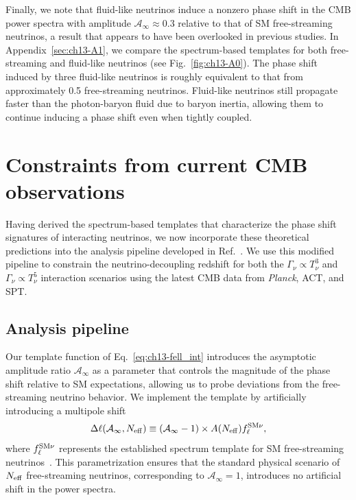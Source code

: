 Finally, we note that fluid-like neutrinos induce a nonzero phase shift in the CMB power spectra with amplitude $\mathcal{A}_\infty \approx 0.3$ relative to that of SM free-streaming neutrinos, a result that appears to have been overlooked in previous studies.
In Appendix~\ref{sec:ch13-A1}, we compare the spectrum-based templates for both free-streaming and fluid-like neutrinos (see Fig.~\ref{fig:ch13-A0}). The phase shift induced by three fluid-like neutrinos is roughly equivalent to that from approximately 0.5 free-streaming neutrinos. Fluid-like neutrinos still propagate faster than the photon-baryon fluid due to baryon inertia, allowing them to continue inducing a phase shift even when tightly coupled.

\section{Constraints from current CMB observations}
\label{sec:ch13-3}

\noindent Having derived the spectrum-based templates that characterize the phase shift signatures of interacting neutrinos, we now incorporate these theoretical predictions into the analysis pipeline developed in Ref.~\cite{Montefalcone:2025unv}. We use this modified pipeline to constrain the neutrino-decoupling redshift for both the $\Gamma_\nu \propto T_\nu^3$ and $\Gamma_\nu \propto T_\nu^5$ interaction scenarios using the latest CMB data from \textit{Planck}, ACT, and SPT.

\subsection{Analysis pipeline}

\noindent Our template function of Eq.~\eqref{eq:ch13-fell_int} introduces the asymptotic amplitude ratio $\mathcal{A}_\infty$ as a parameter that controls the magnitude of the phase shift relative to SM expectations, allowing us to probe deviations from the free-streaming neutrino behavior.
We implement the template by artificially introducing a multipole shift
\begin{align}
    \Delta\ell (\mathcal{A}_\infty,N_\mathrm{eff})\equiv \left(\mathcal{A}_\infty -1\right) \times A(N_\mathrm{eff})f^{\rm SM\nu}_\ell, \label{eq:ch13-deltaell_data}
\end{align}
where $f_\ell^{\rm SM\nu}$ represents the established spectrum template for SM free-streaming neutrinos~\cite{Montefalcone:2025unv}. This parametrization ensures that the standard physical scenario of $N_\mathrm{eff}$ free-streaming neutrinos, corresponding to $\mathcal{A}_\infty = 1$, introduces no artificial shift in the power spectra.

